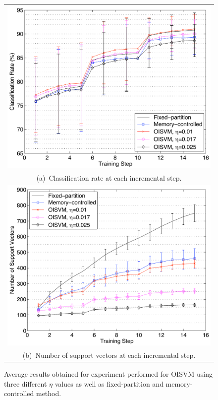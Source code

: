 \begin{figure}[t]
\footnotesize
  \begin{tabular}{@{}c@{}}
  \includegraphics[width=0.95\linewidth]{figs/results/chi_cr}\\
  (a)~Classification rate at each incremental step.\vspace{0.1cm}\\
  \includegraphics[width=0.95\linewidth]{figs/results/chi_sv}\\
  (b)~Number of support vectors at each incremental step.\\
  \end{tabular}
\caption{Average results obtained for experiment performed for
         OISVM using three different $\eta$ values as well as
         fixed-partition and memory-controlled method. }
\label{fig:chi}
\end{figure}
